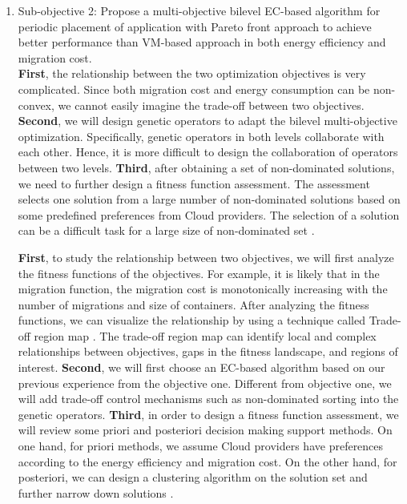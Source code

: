 \begin{enumerate}

	\item Sub-objective 2: Propose a multi-objective bilevel EC-based algorithm for periodic placement of application with Pareto front approach to achieve better performance than VM-based approach in both energy efficiency and migration cost.\\

	 \textbf{First}, the relationship between the two optimization objectives is very complicated. Since both migration cost and energy consumption can be non-convex, we cannot easily imagine the trade-off between two objectives. \textbf{Second}, we will design genetic operators to adapt the bilevel multi-objective optimization. Specifically, genetic operators in both levels collaborate with each other. Hence, it is more difficult to design the collaboration of operators between two levels.  \textbf{Third}, after obtaining a set of non-dominated solutions, we need to further design a fitness function assessment. The assessment selects one solution from a large number of non-dominated solutions based on some predefined preferences from Cloud providers. The selection of a solution can be a difficult task for a large size of non-dominated set \cite{Zio:2012jz}. 

	 \textbf{First}, to study the relationship between two objectives, we will first analyze the fitness functions of the objectives. For example, it is likely that in the migration function, the migration cost is monotonically increasing with the number of migrations and size of containers. After analyzing the fitness functions, we can visualize the relationship by using a technique called Trade-off region map \cite{Pinheiro:2015eu}. The trade-off region map can identify local and complex relationships between objectives, gaps in the fitness landscape, and regions of interest. \textbf{Second}, we will first choose an EC-based algorithm based on our previous experience from the objective one. Different from objective one, we will add trade-off control mechanisms such as non-dominated sorting into the genetic operators. \textbf{Third}, in order to design a fitness function assessment, we will review some priori and posteriori decision making support methods. On one hand, for priori methods, we assume Cloud providers have preferences according to the energy efficiency and migration cost.  On the other hand, for posteriori, we can design a clustering algorithm on the solution set and further narrow down solutions \cite{Zio:2011iq}. 


\end{enumerate}
